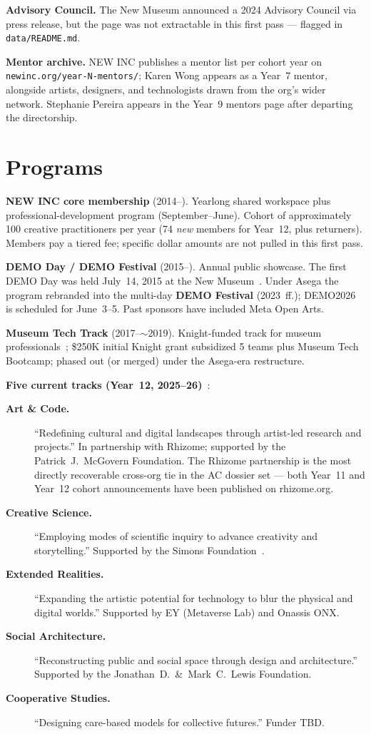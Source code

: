 \documentclass[10pt,letterpaper,twocolumn]{article}
\begin{document}
\textbf{Advisory Council.} The New Museum announced a 2024 Advisory Council via press release, but the page was not extractable in this first pass --- flagged in \texttt{data/README.md}.

\textbf{Mentor archive.} NEW INC publishes a mentor list per cohort year on \texttt{newinc.org/year-N-mentors/}; Karen Wong appears as a Year~7 mentor, alongside artists, designers, and technologists drawn from the org's wider network. Stephanie Pereira appears in the Year~9 mentors page after departing the directorship.

\section{Programs}\label{sec:programs}

\textbf{NEW INC core membership} (2014--). Yearlong shared workspace plus professional-development program (September--June). Cohort of approximately 100 creative practitioners per year (74 \emph{new} members for Year~12, plus returners). Members pay a tiered fee; specific dollar amounts are not pulled in this first pass.

\textbf{DEMO Day / DEMO Festival} (2015--). Annual public showcase. The first DEMO Day was held July~14, 2015 at the New Museum~\citep{broadwayworld2015demo}. Under Asega the program rebranded into the multi-day \textbf{DEMO Festival} (2023~ff.); DEMO2026 is scheduled for June~3--5. Past sponsors have included Meta Open Arts.

\textbf{Museum Tech Track} (2017--$\sim$2019). Knight-funded track for museum professionals~\citep{knight2017newinc}; \$250K initial Knight grant subsidized 5 teams plus Museum Tech Bootcamp; phased out (or merged) under the Asega-era restructure.

\textbf{Five current tracks (Year~12, 2025--26)}~\citep{newmuseum2025y12,rhizome2025y12}:

\begin{description}
\item[\textbf{Art \& Code.}] ``Redefining cultural and digital landscapes through artist-led research and projects.'' In partnership with Rhizome; supported by the Patrick~J.~McGovern Foundation. The Rhizome partnership is the most directly recoverable cross-org tie in the AC dossier set --- both Year~11 and Year~12 cohort announcements have been published on rhizome.org.
\item[\textbf{Creative Science.}] ``Employing modes of scientific inquiry to advance creativity and storytelling.'' Supported by the Simons Foundation~\citep{newinccreativescience}.
\item[\textbf{Extended Realities.}] ``Expanding the artistic potential for technology to blur the physical and digital worlds.'' Supported by EY (Metaverse Lab) and Onassis ONX.
\item[\textbf{Social Architecture.}] ``Reconstructing public and social space through design and architecture.'' Supported by the Jonathan~D.~\&~Mark~C.~Lewis Foundation.
\item[\textbf{Cooperative Studies.}] ``Designing care-based models for collective futures.'' Funder TBD.
\end{description}
\end{document}
